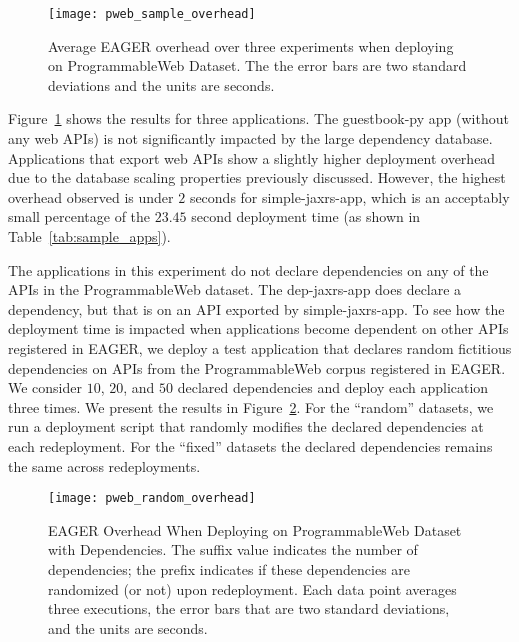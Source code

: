 \begin{figure}
\centering
\texttt{[image: pweb\_sample\_overhead]}
\caption{Average EAGER overhead over three experiments when deploying on
ProgrammableWeb Dataset.  The the error bars are two standard deviations and
the units are seconds.}
\label{fig:pweb_sample_overhead}
\end{figure}

Figure~\ref{fig:pweb_sample_overhead} shows the results for three applications. The guestbook-py app
(without any web APIs) is not significantly impacted by the large dependency database. 
Applications that export web APIs show a slightly higher deployment overhead
due to the database scaling properties previously discussed. 
However, the highest overhead observed is under $2$ seconds for
simple-jaxrs-app, which is an 
acceptably small percentage of the $23.45$ second deployment time (as shown in
Table~\ref{tab:sample_apps}).

The applications in this experiment do not declare dependencies on any of the APIs 
in the ProgrammableWeb dataset. The dep-jaxrs-app does declare a dependency, 
but that is on an API exported by 
simple-jaxrs-app. To see how the deployment time is impacted
when applications become dependent on other APIs registered in EAGER, we
deploy a test application that declares random fictitious dependencies on APIs
from the ProgrammableWeb corpus registered in EAGER.  We consider 
$10$, $20$, and $50$ declared dependencies and deploy each
application three times.
We present the results in Figure~\ref{fig:pweb_random_overhead}.
For the ``random'' datasets, we
run a deployment script that randomly modifies the 
declared dependencies at each redeployment. For the 
``fixed'' datasets the declared dependencies remains the same across
redeployments.

\begin{figure}
\centering
\texttt{[image: pweb\_random\_overhead]}
\caption{EAGER Overhead When Deploying on ProgrammableWeb Dataset with
Dependencies. The suffix value indicates the number of dependencies;
the prefix indicates if these dependencies are randomized (or not) upon
redeployment.  Each data point averages three executions,
the error bars that are two standard deviations, and the units are seconds.
\label{fig:pweb_random_overhead}
}
\vspace{-0.2in}
\end{figure}


